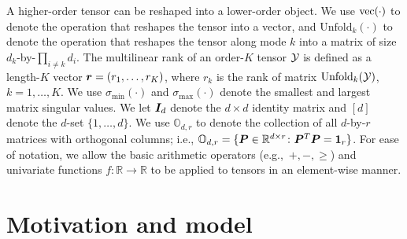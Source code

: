 \documentclass[12pt]{article}
\theoremstyle{definition}
\theoremstyle{definition}
\begin{document}
A higher-order tensor can be reshaped into a lower-order object. We use $\textup{vec}(\cdot)$ to denote the operation that reshapes the tensor into a vector, and $\text{Unfold}_k(\cdot)$ to denote the operation that reshapes the tensor along mode $k$ into a matrix of size $d_k$-by-$\prod_{i\neq k}d_i$. The multilinear rank of an order-$K$ tensor $\mathcal{Y}$ is defined as a length-$K$ vector $\bm{r}=(r_1,\ldots,r_K)$, where $r_k$ is the rank of matrix $\textup{Unfold}_k(\mathcal{Y})$, $k=1,\ldots,K$. We use $\sigma_{\min}(\cdot)$ and $\sigma_{\max}(\cdot)$ denote the smallest and largest matrix singular values. We let $\bm I_d$ denote the $d \times d$ identity matrix and $[d]$ denote the $d$-set $\{1,\ldots,d\}$. We use $\mathbb{O}_{d,r}$ to denote the collection of all $d$-by-$r$ matrices with orthogonal columns; i.e., $\mathbb{O}_{d,r}=\{\bm{P}\in\mathbb{R}^{d\times r}\colon \bm{P}^T\bm{P} = \mathbf{1}_r\}$. For ease of notation, we allow the basic arithmetic operators (e.g.,\ $+, -, \geq $) and univariate functions $f\colon \mathbb{R}\to \mathbb{R}$ to be applied to tensors in an element-wise manner. 

\section{Motivation and model}\label{sec:model}
\end{document}
